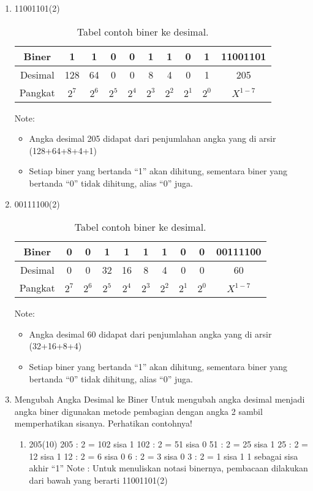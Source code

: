 \documentclass{article}
\begin{document}
\begin{enumerate}
\item 11001101(2) 

\begin{table}[h!]
\centering
\begin{tabular}{ |c|c|c|c|c|c|c|c|c|c| } 
\hline
Biner & 1 & 1 & 0 & 0 & 1 & 1 & 0 & 1 & 11001101 \\ 
\hline
Desimal & 128 & 64 & 0 & 0 & 8 & 4 & 0 & 1 & 205 \\ 
\hline
Pangkat & $2^7$ & $2^6$ & $2^5$ & $2^4$ & $2^3$ & $2^2$ & $2^1$ & $2^0$ & $X^{1-7}$ \\ 
\hline
\end{tabular}
\caption{Tabel contoh biner ke desimal.}
\label{table:contoh2}
\end{table}

Note:

\begin{itemize}
\item Angka desimal 205 didapat dari penjumlahan angka yang di arsir (128+64+8+4+1)
\item Setiap biner yang bertanda “1” akan dihitung, sementara biner yang bertanda “0” tidak dihitung, alias “0” juga.
\end{itemize}

\item 00111100(2) 

\begin{table}[h!]
\centering
\begin{tabular}{ |c|c|c|c|c|c|c|c|c|c| } 
\hline
Biner & 0 & 0 & 1 & 1 & 1 & 1 & 0 & 0 & 00111100 \\ 
\hline
Desimal & 0 & 0 & 32 & 16 & 8 & 4 & 0 & 0 & 60 \\ 
\hline
Pangkat & $2^7$ & $2^6$ & $2^5$ & $2^4$ & $2^3$ & $2^2$ & $2^1$ & $2^0$ & $X^{1-7}$ \\ 
\hline
\end{tabular}
\caption{Tabel contoh biner ke desimal.}
\label{table:contoh2}
\end{table}

Note:
\begin{itemize}
\item Angka desimal 60 didapat dari penjumlahan angka yang di arsir (32+16+8+4)
\item Setiap biner yang bertanda “1” akan dihitung, sementara biner yang bertanda “0” tidak dihitung, alias “0” juga.
\end{itemize}

\item Mengubah Angka Desimal ke Biner 
Untuk mengubah angka desimal menjadi angka biner digunakan metode pembagian dengan angka 2 sambil memperhatikan sisanya. 
Perhatikan contohnya! 
\begin{enumerate}
\item 205(10)
 205 : 2 = 102 sisa 1 
102 : 2 = 51 sisa 0 
51 : 2 = 25 sisa 1
25 : 2 = 12 sisa 1 
12 : 2 = 6 sisa 0 
6 : 2 = 3 sisa 0 
3 : 2 = 1 sisa 1 
1 \textrightarrow sebagai sisa akhir “1”
Note :
Untuk menuliskan notasi binernya, pembacaan dilakukan dari bawah yang berarti 11001101(2) 


\end{enumerate}
\end{enumerate}
\end{document}
